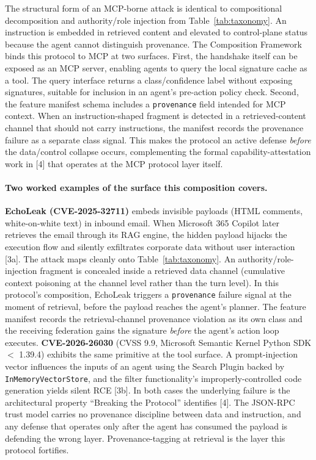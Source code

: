 \documentclass[11pt]{article}
\begin{document}
The structural form of an MCP-borne attack is identical to compositional decomposition and authority/role injection from Table~\ref{tab:taxonomy}. An instruction is embedded in retrieved content and elevated to control-plane status because the agent cannot distinguish provenance. The Composition Framework binds this protocol to MCP at two surfaces. First, the handshake itself can be exposed as an MCP server, enabling agents to query the local signature cache as a tool. The query interface returns a class/confidence label without exposing signatures, suitable for inclusion in an agent's pre-action policy check. Second, the feature manifest schema includes a \texttt{provenance} field intended for MCP context. When an instruction-shaped fragment is detected in a retrieved-content channel that should not carry instructions, the manifest records the provenance failure as a separate class signal. This makes the protocol an active defense \emph{before} the data/control collapse occurs, complementing the formal capability-attestation work in [4] that operates at the MCP protocol layer itself.

\paragraph{Two worked examples of the surface this composition covers.}
\textbf{EchoLeak (CVE-2025-32711)} embeds invisible payloads (HTML comments, white-on-white text) in inbound email. When Microsoft 365 Copilot later retrieves the email through its RAG engine, the hidden payload hijacks the execution flow and silently exfiltrates corporate data without user interaction [3a]. The attack maps cleanly onto Table~\ref{tab:taxonomy}. An authority/role-injection fragment is concealed inside a retrieved data channel (cumulative context poisoning at the channel level rather than the turn level). In this protocol's composition, EchoLeak triggers a \texttt{provenance} failure signal at the moment of retrieval, before the payload reaches the agent's planner. The feature manifest records the retrieval-channel provenance violation as its own class and the receiving federation gains the signature \emph{before} the agent's action loop executes. \textbf{CVE-2026-26030} (CVSS 9.9, Microsoft Semantic Kernel Python SDK $<$ 1.39.4) exhibits the same primitive at the tool surface. A prompt-injection vector influences the inputs of an agent using the Search Plugin backed by \texttt{InMemoryVectorStore}, and the filter functionality's improperly-controlled code generation yields silent RCE [3b]. In both cases the underlying failure is the architectural property ``Breaking the Protocol'' identifies [4]. The JSON-RPC trust model carries no provenance discipline between data and instruction, and any defense that operates only after the agent has consumed the payload is defending the wrong layer. Provenance-tagging at retrieval is the layer this protocol fortifies.
\end{document}

